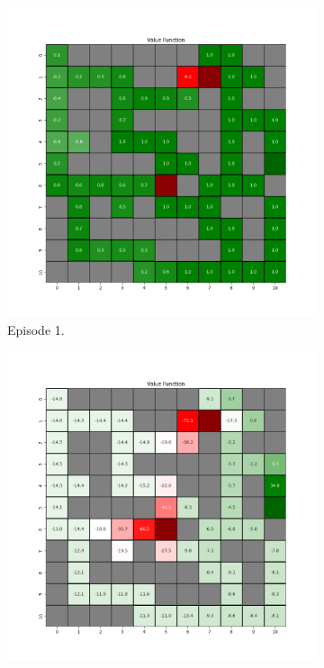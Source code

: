 \documentclass{assignment}
\begin{document}
\begin{figure}[H]
    \begin{subfigure}{0.3\textwidth}
        \includegraphics[width=\textwidth]{figures/value_td/epsilon_sweep/value_function_alpha_0.1_gamma_0.95_epsilon_0.8_iteration_1.png}
    \caption{Episode 1.}
    \end{subfigure}\hfill
    \begin{subfigure}{0.3\textwidth}
        \includegraphics[width=\textwidth]{figures/value_td/epsilon_sweep/value_function_alpha_0.1_gamma_0.95_epsilon_0.8_iteration_50.png}

\end{subfigure}
\end{figure}
\end{document}
